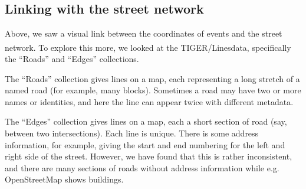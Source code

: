 \documentclass[twoside,a4paper,twocolumn,10pt]{article}
\theoremstyle{plain}
\theoremstyle{definition}
\newcommand{\regsym}{\textsuperscript{\textregistered}}
\begin{document}
\subsection{Linking with the street network}\label{sec:link_st_net}

Above, we saw a visual link between the coordinates of events and the street network.
To explore this more, we looked at the TIGER/Lines\regsym data, specifically the
``Roads'' and ``Edges'' collections.

The ``Roads'' collection gives lines on a map, each representing a long stretch of
a named road (for example, many blocks).  Sometimes a road may have two or more names
or identities, and here the line can appear twice with different metadata.

The ``Edges'' collection gives lines on a map, each a short section of road (say,
between two intersections).  Each line is unique.  There is some address information,
for example, giving the start and end numbering for the left and right side of the
street.  However, we have found that this is rather inconsistent, and there are many
sections of roads without address information while e.g. OpenStreetMap shows buildings.
\end{document}
